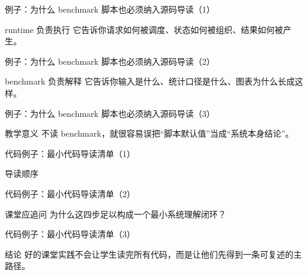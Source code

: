 \begin{frame}{例子：为什么 benchmark 脚本也必须纳入源码导读（1）}
\begin{block}{runtime 负责执行}
    它告诉你请求如何被调度、状态如何被组织、结果如何被产生。
  \end{block}
\end{frame}

\begin{frame}{例子：为什么 benchmark 脚本也必须纳入源码导读（2）}
\begin{block}{benchmark 负责解释}
    它告诉你输入是什么、统计口径是什么、图表为什么长成这样。
  \end{block}
\end{frame}

\begin{frame}{例子：为什么 benchmark 脚本也必须纳入源码导读（3）}
\begin{block}{教学意义}
    不读 benchmark，就很容易误把“脚本默认值”当成“系统本身结论”。
  \end{block}
\end{frame}

\begin{frame}{代码例子：最小代码导读清单（1）}
\begin{block}{导读顺序}
    {\ttfamily\small
    \par
    \par
    \par
    \par
    }
  \end{block}
\end{frame}

\begin{frame}{代码例子：最小代码导读清单（2）}
\begin{block}{课堂应追问}
    为什么这四步足以构成一个最小系统理解闭环？
  \end{block}
\end{frame}

\begin{frame}{代码例子：最小代码导读清单（3）}
\begin{block}{结论}
    好的课堂实践不会让学生读完所有代码，而是让他们先得到一条可复述的主路径。
  \end{block}
\end{frame}


